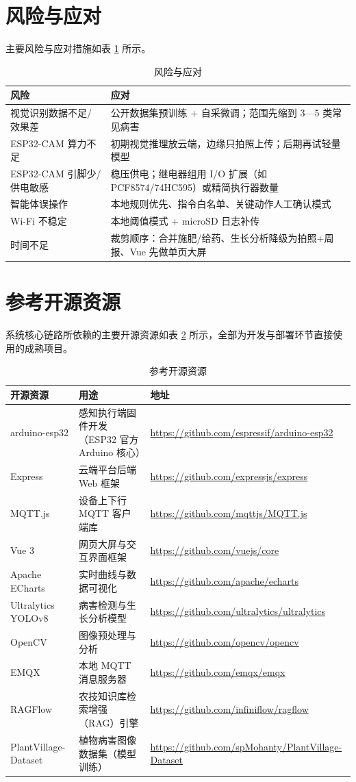 ﻿\documentclass[11pt]{ctexart}
\begin{document}
\section{风险与应对}
主要风险与应对措施如表 \ref{tab:risk} 所示。
\begin{longtable}{p{5.2cm}p{10.0cm}}
  \caption{风险与应对}\label{tab:risk}\\
  \toprule
  风险 & 应对 \\
  \midrule
  视觉识别数据不足/效果差 & 公开数据集预训练 + 自采微调；范围先缩到 3—5 类常见病害 \\
  ESP32-CAM 算力不足 & 初期视觉推理放云端，边缘只拍照上传；后期再试轻量模型 \\
  ESP32-CAM 引脚少/供电敏感 & 稳压供电；继电器组用 I/O 扩展（如 PCF8574/74HC595）或精简执行器数量 \\
  智能体误操作 & 本地规则优先、指令白名单、关键动作人工确认模式 \\
  Wi-Fi 不稳定 & 本地阈值模式 + microSD 日志补传 \\
  时间不足 & 裁剪顺序：合并施肥/给药、生长分析降级为拍照+周报、Vue 先做单页大屏 \\
  \bottomrule
\end{longtable}

\section{参考开源资源}
系统核心链路所依赖的主要开源资源如表 \ref{tab:oss} 所示，全部为开发与部署环节直接使用的成熟项目。
\begin{longtable}{p{3.6cm}p{5.8cm}p{5.8cm}}
  \caption{参考开源资源}\label{tab:oss}\\
  \toprule
  开源资源 & 用途 & 地址 \\
  \midrule
  arduino-esp32 & 感知执行端固件开发（ESP32 官方 Arduino 核心） & \url{https://github.com/espressif/arduino-esp32} \\
  Express & 云端平台后端 Web 框架 & \url{https://github.com/expressjs/express} \\
  MQTT.js & 设备上下行 MQTT 客户端库 & \url{https://github.com/mqttjs/MQTT.js} \\
  Vue 3 & 网页大屏与交互界面框架 & \url{https://github.com/vuejs/core} \\
  Apache ECharts & 实时曲线与数据可视化 & \url{https://github.com/apache/echarts} \\
  Ultralytics YOLOv8 & 病害检测与生长分析模型 & \url{https://github.com/ultralytics/ultralytics} \\
  OpenCV & 图像预处理与分析 & \url{https://github.com/opencv/opencv} \\
  EMQX & 本地 MQTT 消息服务器 & \url{https://github.com/emqx/emqx} \\
  RAGFlow & 农技知识库检索增强（RAG）引擎 & \url{https://github.com/infiniflow/ragflow} \\
  PlantVillage-Dataset & 植物病害图像数据集（模型训练） & \url{https://github.com/spMohanty/PlantVillage-Dataset} \\
  \bottomrule
\end{longtable}
\end{document}
